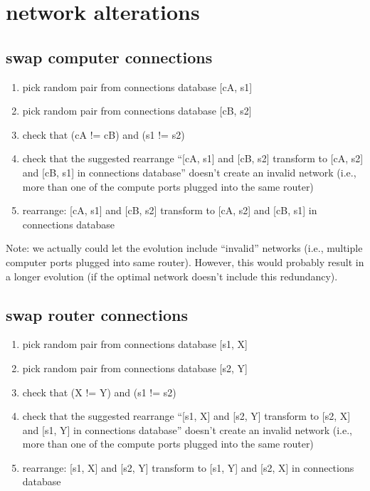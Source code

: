 \documentclass[pdftex]{article}
\begin{document}
\section{network alterations}

\subsection{swap computer connections}

\begin{enumerate}
 \item pick random pair from connections database {[}cA, s1]
 \item pick random pair from connections database {[}cB, s2]
 \item check that (cA != cB) and (s1 != s2)
 \item check that the suggested rearrange ``{[}cA, s1] and {[}cB, s2] transform to {[}cA, s2] and {[}cB, s1] in connections database'' doesn't create an invalid network (i.e., more than one of the compute ports plugged into the same router)
 \item rearrange: {[}cA, s1] and {[}cB, s2] transform to {[}cA, s2] and {[}cB, s1] in connections database
\end{enumerate}

Note: we actually could let the evolution include ``invalid'' networks (i.e., multiple computer ports plugged into same router). However, this would probably result in a longer evolution (if the optimal network doesn't include this redundancy).

\subsection{swap router connections}

\begin{enumerate}
 \item pick random pair from connections database {[}s1, X]
 \item pick random pair from connections database {[}s2, Y]
 \item check that (X != Y) and (s1 != s2)
 \item check that the suggested rearrange ``{[}s1, X] and {[}s2, Y] transform to {[}s2, X] and {[}s1, Y] in connections database'' doesn't create an invalid network (i.e., more than one of the compute ports plugged into the same router)
 \item rearrange: {[}s1, X] and {[}s2, Y] transform to {[}s1, Y] and {[}s2, X] in connections database
\end{enumerate}
\end{document}
